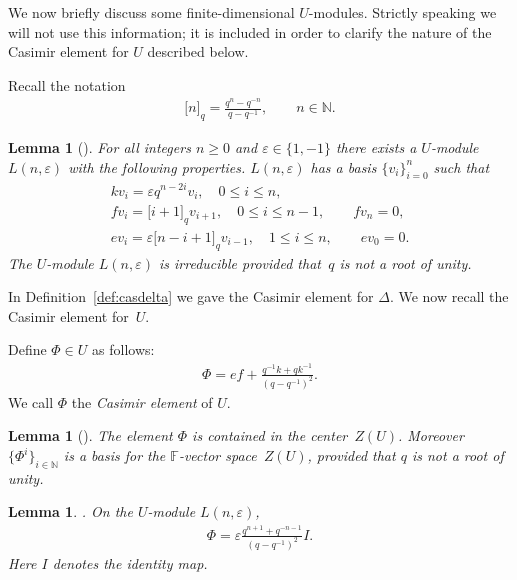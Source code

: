 \documentclass[11pt]{article}
\numberwithin{equation}{section}
\newtheorem{Lemma}[Theorem]{Lemma}
\begin{document}
 We now brief\/ly discuss some
f\/inite-dimensional $U$-modules. Strictly speaking
we will not use this information; it is included
in order to clarify the nature of the Casimir element
for $U$ described below.

Recall the notation
\begin{gather*}
  \lbrack  n \rbrack_q=\frac{q^n-q^{-n}}{q-q^{-1}},
  \qquad n \in \mathbb N.
\end{gather*}

\begin{Lemma}[]
For all integers $n\geq 0$ and $\varepsilon \in \lbrace 1,-1\rbrace$
there exists a
$U$-module
$L(n,\varepsilon)$ with the following properties.
$L(n,\varepsilon)$ has a basis
$\lbrace v_i\rbrace_{i=0}^n$
such that
\begin{gather*}
k v_i  =  \varepsilon q^{n-2i} v_i, \quad  0 \leq i \leq n,
\\
f v_i = \lbrack i+1 \rbrack_q v_{i+1}, \quad 0 \leq i \leq n-1,
\qquad fv_n =0,
\\
e v_i = \varepsilon
\lbrack n-i+1 \rbrack_q v_{i-1}, \quad 1 \leq i \leq n,
\qquad ev_0 =0.
\end{gather*}
The
$U$-module
$L(n,\varepsilon)$ is irreducible provided that~$q$ is not a root of unity.
\end{Lemma}


In Def\/inition~\ref{def:casdelta} we gave the Casimir element
for $\Delta$. We now recall the Casimir element
for~$U$.

\begin{Definition}
\label{def:casu}
Def\/ine
 $\Phi \in
U$ as follows:
\begin{gather*}
\Phi = ef +\frac{q^{-1}k + qk^{-1}}{(q-q^{-1})^2}.
\end{gather*}
We call $\Phi$ the {\it Casimir element} of
$U$.
\end{Definition}

\begin{Lemma}[]
The element
$\Phi$ is contained in the center~$Z(U)$.
Moreover $\lbrace \Phi^i\rbrace_{i \in \mathbb N}$ is a basis
for the $\mathbb F$-vector space~$Z(U)$,
 provided that $q$ is not a root of unity.
\end{Lemma}





\begin{Lemma}
\label{lem:normmeaning}
{\rm \cite[Lemma~2.7]{jantzen}.}
On the
$U$-module
$L(n,\varepsilon)$,
\begin{gather*}
\Phi  =  \varepsilon \frac{q^{n+1}+q^{-n-1}}{(q-q^{-1})^2} I.
\end{gather*}
Here $I$ denotes the identity map.
\end{Lemma}
\end{document}
